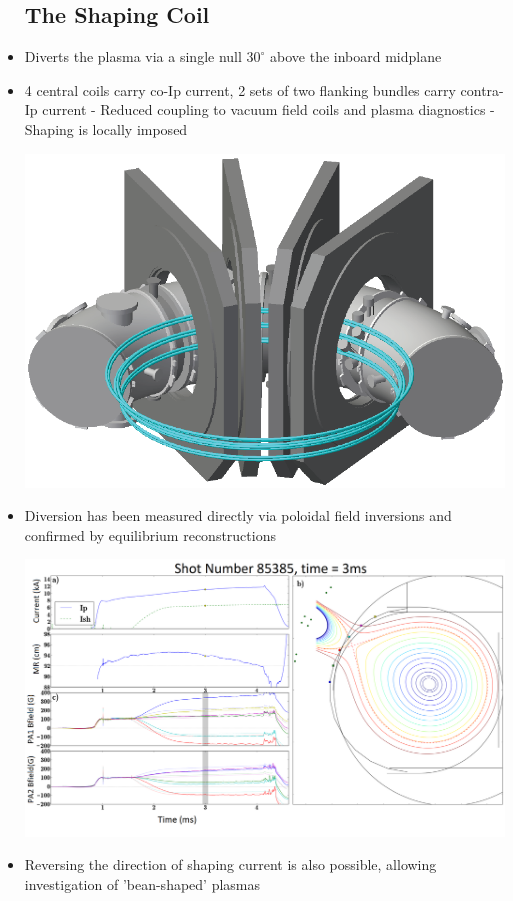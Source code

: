 \documentclass{article}
\begin{document}
\begin{multicols}{5}
\begin{itemize}
\begin{center}
\subsection{The Shaping Coil}
\end{center}
\item Diverts the plasma via a single null $30^{\circ}$ above the inboard midplane
\item 4 central coils carry co-Ip current, 2 sets of two flanking bundles carry contra-Ip current
\subitem - Reduced coupling to vacuum field coils and plasma diagnostics
\subitem - Shaping is locally imposed

\begin{center}
\includegraphics[width=0.9\columnwidth]{HBT_section_cropped}\\
\end{center}

\item Diversion has been measured directly via poloidal field inversions and confirmed by equilibrium reconstructions
\begin{center}
\includegraphics[width=1.05\columnwidth]{flux_surfaces_during_shaping85385_1}\\
\end{center}
\item Reversing the direction of shaping current is also possible, allowing investigation of 'bean-shaped' plasmas


\end{itemize}
\end{multicols}
\end{document}
